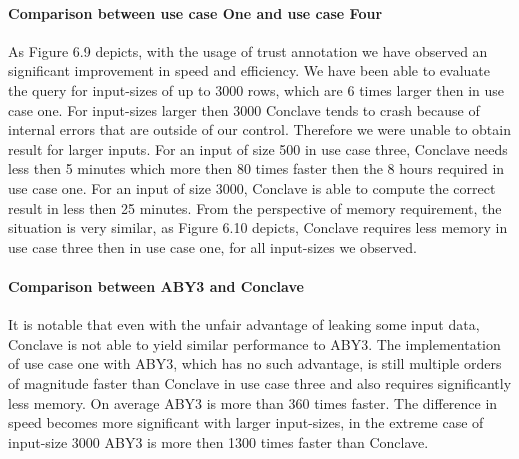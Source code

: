 \paragraph{Comparison between use case One and use case Four }
As Figure 6.9 depicts, with the usage of trust annotation we have observed an significant improvement in speed and efficiency. We have been able to evaluate the query for input-sizes of up to 3000 rows, which are 6 times larger then in use case one. For input-sizes larger then 3000 Conclave tends to crash because of internal errors that are outside of our control. Therefore we were unable to obtain result for larger inputs.  For an input of size 500 in use case three, Conclave needs less then 5 minutes which more then 80 times faster then the 8 hours required in use case one. For an input of size 3000, Conclave is able to compute the correct result in less then 25 minutes. From the perspective of memory requirement, the situation is very similar, as Figure 6.10 depicts, Conclave requires less memory in use case three then in use case one, for all input-sizes we observed. 

\paragraph{Comparison between ABY3 and Conclave}
It is notable that even with the unfair advantage of leaking some input data, Conclave is not able to yield similar performance to ABY3. The implementation of use case one with ABY3, which has no such advantage, is still multiple orders of magnitude faster than Conclave in use case three and also requires significantly less memory. On average ABY3 is more than 360 times faster. The difference in speed becomes more significant with larger input-sizes, in the extreme case of input-size 3000 ABY3 is more then 1300 times faster than Conclave. 


